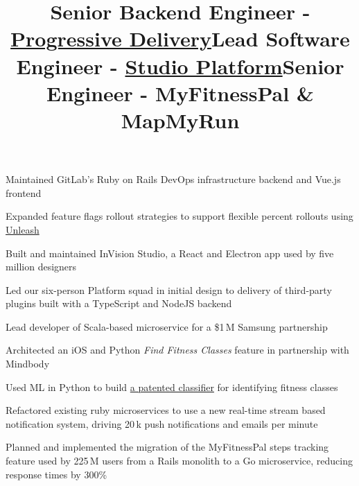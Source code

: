 \documentclass[12pt, tweaklist, line]{res}
\let\tempone\itemize
\let\temptwo\enditemize
\renewenvironment{itemize}{\tempone\vspace{-.15in}\setlength{\topsep}{0pt}\setlength{\itemsep}{3pt}\vspace{-.15in}}{\temptwo}
\begin{document}
\begin{resume}
\title{Senior Backend Engineer - \href{https://about.gitlab.com/handbook/engineering/development/ops/release/progressive-delivery/}{Progressive Delivery}}
\begin{position}
\begin{itemize}
\item Maintained GitLab's Ruby on Rails DevOps infrastructure backend and Vue.js frontend
\item Expanded feature flags rollout strategies to support flexible percent rollouts using \href{https://unleash.github.io/}{Unleash}
\end{itemize}
\end{position}

\title{Lead Software Engineer - \href{https://www.invisionapp.com/studio}{Studio Platform}}
\begin{position}
\begin{itemize}
\item Built and maintained InVision Studio, a React and Electron app used by five million designers
\item Led our six-person Platform squad in initial design to delivery of third-party plugins built with a TypeScript and NodeJS backend
\end{itemize}
\end{position}

\title{Senior Engineer - MyFitnessPal \& MapMyRun}
\begin{position}
\begin{itemize}
\item Lead developer of Scala-based microservice for a \$1\,M Samsung partnership
\item Architected an iOS and Python \textit{Find Fitness Classes} feature in partnership with Mindbody
\item Used ML in Python to build \href{https://patents.google.com/patent/US20180225367A1/en?oq=20180225367}{a patented classifier} for identifying fitness classes
\item Refactored existing ruby microservices to use a new real-time stream based notification system, driving 20\,k push notifications and emails per minute
\item Planned and implemented the migration of the MyFitnessPal steps tracking feature used by 225\,M users from a Rails monolith to a Go microservice, reducing response times by 300\%
\end{itemize}
\end{position}



\end{resume}
\end{document}
